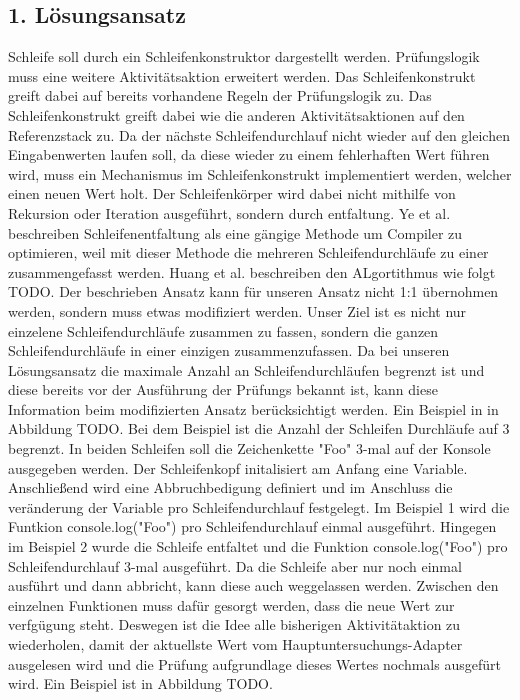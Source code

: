 \documentclass{article}
\begin{document}
    \subsection{1. Lösungsansatz}
    Schleife soll durch ein Schleifenkonstruktor dargestellt werden.
    Prüfungslogik muss eine weitere Aktivitätsaktion erweitert werden. Das Schleifenkonstrukt greift dabei auf bereits vorhandene Regeln der Prüfungslogik zu.
    Das Schleifenkonstrukt greift dabei wie die anderen Aktivitätsaktionen auf den Referenzstack zu. Da der nächste Schleifendurchlauf nicht wieder auf den gleichen Eingabenwerten laufen soll, da diese wieder zu einem fehlerhaften Wert führen wird, muss ein Mechanismus im Schleifenkonstrukt implementiert werden, welcher einen neuen Wert holt.
    Der Schleifenkörper wird dabei nicht mithilfe von Rekursion oder Iteration ausgeführt, sondern durch entfaltung. 
    Ye et al. beschreiben Schleifenentfaltung als eine gängige Methode um Compiler zu optimieren, weil mit dieser Methode die mehreren Schleifendurchläufe zu einer zusammengefasst werden. \cite{9}
    Huang et al. beschreiben den ALgortithmus wie folgt TODO.
    Der beschrieben Ansatz kann für unseren Ansatz nicht 1:1 übernohmen werden, sondern muss etwas modifiziert werden. Unser Ziel ist es nicht nur einzelene Schleifendurchläufe zusammen zu fassen, sondern die ganzen Schleifendurchläufe in einer einzigen zusammenzufassen.
    Da bei unseren Lösungsansatz die maximale Anzahl an Schleifendurchläufen begrenzt ist und diese bereits vor der Ausführung der Prüfungs bekannt ist, kann diese Information beim modifizierten Ansatz berücksichtigt werden. Ein Beispiel in in Abbildung TODO.
    Bei dem Beispiel ist die Anzahl der Schleifen Durchläufe auf 3 begrenzt. In beiden Schleifen soll die Zeichenkette "Foo" 3-mal auf der Konsole ausgegeben werden. 
    Der Schleifenkopf initalisiert am Anfang eine Variable. Anschließend wird eine Abbruchbedigung definiert und im Anschluss die veränderung der Variable pro Schleifendurchlauf festgelegt.
    Im Beispiel 1 wird die Funtkion console.log("Foo") pro Schleifendurchlauf einmal ausgeführt.
    Hingegen im Beispiel 2 wurde die Schleife entfaltet und die Funktion console.log("Foo") pro Schleifendurchlauf 3-mal ausgeführt. Da die Schleife aber nur noch einmal ausführt und dann abbricht, kann diese auch weggelassen werden.
    Zwischen den einzelnen Funktionen muss dafür gesorgt werden, dass die neue Wert zur verfgügung steht. Deswegen ist die Idee alle bisherigen Aktivitätaktion zu wiederholen, damit der aktuellste Wert vom Hauptuntersuchungs-Adapter ausgelesen wird und die Prüfung aufgrundlage dieses Wertes nochmals ausgefürt wird. Ein Beispiel ist in Abbildung TODO.
\end{document}

